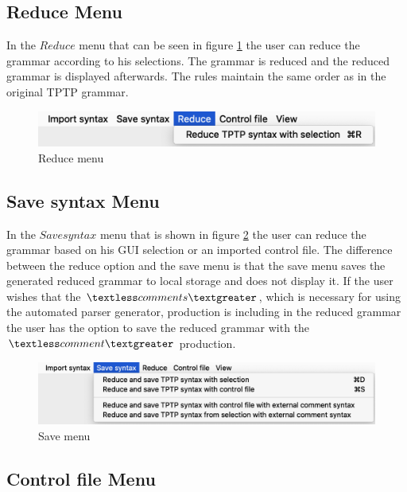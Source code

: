 \subsection{Reduce Menu}\label{sec:ConceptGUIReduceMenu}

In the $Reduce$ menu that can be seen in figure \ref{fig:reduce} the user can reduce the grammar according to his selections. The grammar is reduced and the reduced grammar is displayed afterwards. The rules maintain the same order as in the original TPTP grammar.

\begin{figure}[H]
\centering
\includegraphics[width=.7\textwidth]{images/reduce.png}
\caption{Reduce menu}
\label{fig:reduce}
\end{figure}

\subsection{Save syntax Menu}\label{sec:ConceptGUISaveSyntaxMenu}

In the $Save syntax$ menu that is shown in figure \ref{fig:save} the user can reduce the grammar based on his GUI selection or an imported control file. The difference between the reduce option and the save menu is that the save menu saves the generated reduced grammar to local storage and does not display it. If the user wishes that the $\textless comments\textgreater$, which is necessary for using the automated parser generator, production is including in the reduced grammar the user has the option to save the reduced grammar with the $\textless comment\textgreater$ production.

\begin{figure}[H]
\centering
\includegraphics[width=.7\textwidth]{images/save.png}
\caption{Save menu}
\label{fig:save}
\end{figure}

\subsection{Control file Menu}\label{sec:ConceptGUIControlFileMenu}

